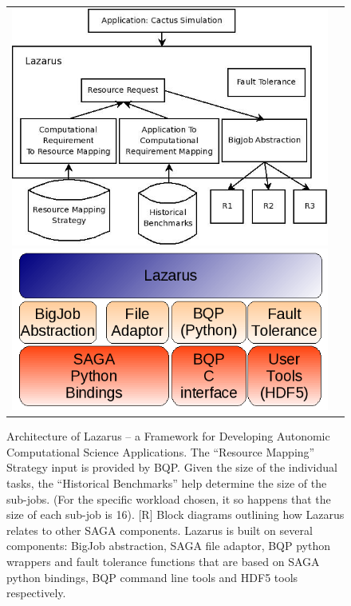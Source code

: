 \documentclass{acm_proc_article-sp}
\newcommand{\up}{\vspace*{-0.3em}}
\begin{document}
\begin{figure}
\begin{tabular}{c|c}
\includegraphics[scale=0.3]{Lazarus_01.jpeg}
\includegraphics[scale=0.6]{Architecture.png}
\end{tabular}

\caption{Architecture of Lazarus -- a Framework for Developing
  Autonomic Computational Science Applications. The ``Resource
  Mapping'' Strategy input is provided by BQP. Given the size of the
  individual tasks, the ``Historical Benchmarks'' help determine the
  size of the sub-jobs. (For the specific workload chosen, it so
  happens that the size of each sub-job is 16). [R] Block diagrams
  outlining how Lazarus relates to other SAGA components. Lazarus is
  built on several components: BigJob abstraction, SAGA file adaptor,
  BQP python wrappers and fault tolerance functions that are based on
  SAGA python bindings, BQP command line tools and HDF5 tools
  respectively.}
\label{fig:application_architecture}
\up\up
\end{figure}
\up\up\up
\end{document}
